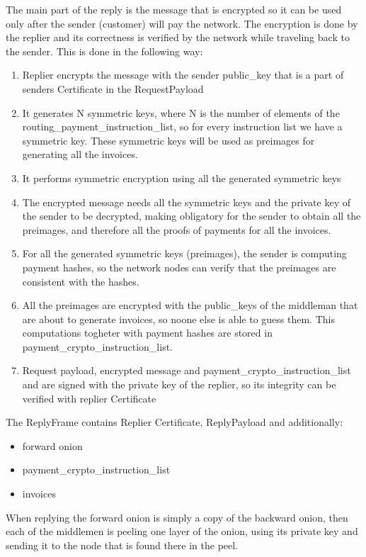 \documentclass{article}
\begin{document}
The main part of the reply is the message that is encrypted so it can be used only after the sender (customer) will pay the network. The encryption is done by the replier and its correctness is verified by the network while traveling back to the sender. This is done in the following way:

\begin{enumerate}
	\item Replier encrypts the message with the sender public\_key that is a part of senders Certificate in the RequestPayload
	\item It generates N symmetric keys, where N is the number of elements of the routing\_payment\_instruction\_list, so for every instruction list we have a symmetric key. These symmetric keys will be used as preimages for generating all the invoices.
	\item It performs symmetric encryption using all the generated symmetric keys
	\item The encrypted message needs all the symmetric keys and the private key of the sender to be decrypted, making obligatory for the sender to obtain all the preimages, and therefore all the proofs of payments for all the invoices.
	\item For all the generated symmetric keys (preimages), the sender is computing payment hashes, so the network nodes can verify that the preimages are consistent with the hashes.
	\item All the preimages are encrypted with the public\_keys of the middleman that are about to generate invoices, so noone else is able to guess them. This computations togheter with payment hashes are stored in payment\_crypto\_instruction\_list.
	\item Request payload, encrypted message and payment\_crypto\_instruction\_list and are signed with the private key of the replier, so its integrity can be verified with replier Certificate
\end{enumerate}

The ReplyFrame contains Replier Certificate, ReplyPayload and additionally:

\begin{itemize}
	\item  forward onion
	\item  payment\_crypto\_instruction\_list
	\item  invoices
\end{itemize}

When replying the forward onion is simply a copy of the backward onion, then each of the middlemen is peeling one layer of the onion, using its private key and sending it to the node that is found there in the peel.
\end{document}
